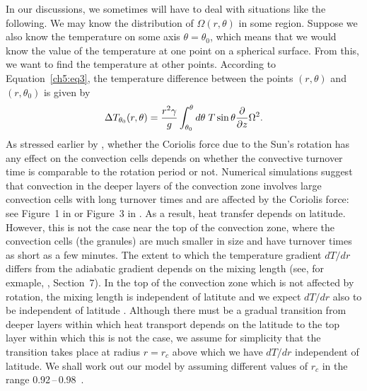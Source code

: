
In our discussions, we sometimes will have to deal with
situations like the following. We may know the distribution of
$\Omega (r, \theta)$ in some region. Suppose we also know 
the temperature on some axis $\theta = \theta_0$, which means
that we would know the value of the temperature at one point on
a spherical surface.  From this, we want to find the temperature at 
other points. According to Equation~\ref{ch5:eq3}, the
temperature difference between the points $(r, \theta)$ and $(r,\theta_0)$
is given by  
\begin{equation}
\Delta T_{\theta_0} (r, \theta) = \frac{r^2 \gamma}{g}
\int_{\theta_0}^{\theta} d\theta \; T
\sin \theta \frac{\partial}{\partial z} \Omega^2.
\label{ch5:eq34}
\end{equation}
%
As stressed earlier by \citet{Choudhuri2021a, Choudhuri2021b},
whether the Coriolis force due to the Sun's rotation has any effect on
the convection cells depends on whether the convective turnover time is
comparable to the rotation period or not.  Numerical simulations suggest 
that convection in the deeper layers of the convection zone involves large
convection cells with long turnover times and are affected by the Coriolis force:
see Figure~1 in \citet{Brown2010} or Figure~3 in \citet{Gastine2014}. As a result,
heat transfer depends on latitude.  However, this is not the case near
the top of the convection zone, where the convection cells (the granules) are
much smaller in size and have turnover times as short as a few minutes.
The extent to which the temperature gradient $d T/ dr$ differs from the
adiabatic gradient depends on the mixing length (see, for exmaple, \citet{Kippenhahn1990}, Section~7).  In the top of the 
convection zone which is not affected by rotation, the mixing length is
independent of latitute and we expect $d T/ dr$ also to be
independent of latitude \citep{Choudhuri2021a}.  Although there must be a gradual transition
from deeper layers within which heat transport depends on the latitude to the
top layer within which this is not the case, we assume for simplicity that the
transition takes place at radius $r = r_c$ above which we
have $d T/d r$ independent of latitude.  We shall work out our model
by assuming different values of $r_c$ in the range 0.92\,--\,0.98~\Rsun.


